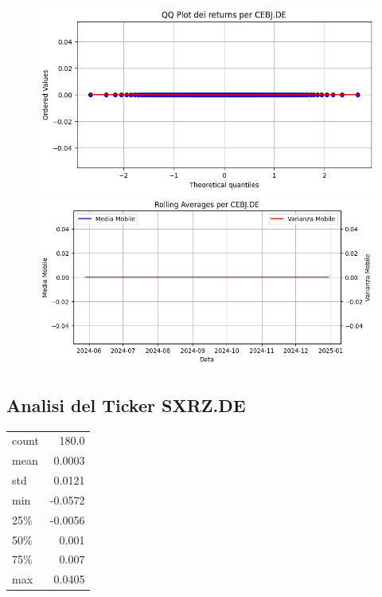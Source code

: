 \documentclass{article}%
\begin{document}
%


\begin{figure}[htbp]%
\begin{minipage}{0.48\textwidth}%
\includegraphics[width=\linewidth]{immagini_tickers/CEBJ.DE_qq_plot.png}%
\end{minipage}%
\begin{minipage}{0.48\textwidth}%
\includegraphics[width=\linewidth]{immagini_tickers/CEBJ.DE_rolling_averages.png}%
\end{minipage}%
\end{figure}

%
\subsection*{Analisi del Ticker SXRZ.DE}%
\label{subsec:AnalisidelTickerSXRZ.DE}%
\begin{tabular}{lr}%
count&180.0\\%
mean&0.0003\\%
std&0.0121\\%
min&{-}0.0572\\%
25\%&{-}0.0056\\%
50\%&0.001\\%
75\%&0.007\\%
max&0.0405\\%
\end{tabular}%
\end{document}
